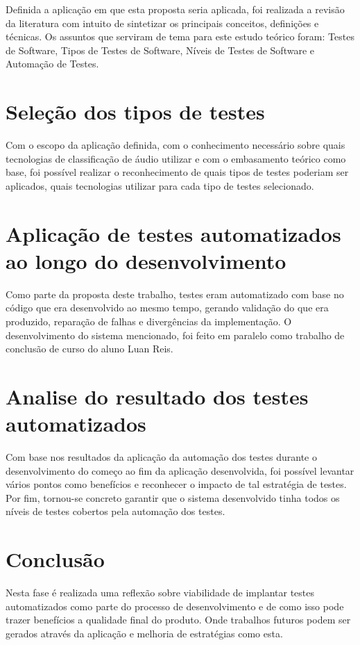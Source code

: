 Definida a aplicação em que esta proposta seria aplicada, foi realizada a revisão da literatura com intuito de sintetizar os principais conceitos, definições e técnicas. Os assuntos que serviram de tema para este estudo teórico foram: Testes de Software, Tipos de Testes de Software, Níveis de Testes de Software e Automação de Testes.

\section{Seleção dos tipos de testes}

Com o escopo da aplicação definida, com o conhecimento necessário sobre quais tecnologias de classificação de áudio utilizar e com o embasamento teórico como base, foi possível realizar o reconhecimento de quais tipos de testes poderiam ser aplicados, quais tecnologias utilizar para cada tipo de testes selecionado. 

\section{Aplicação de testes automatizados ao longo do desenvolvimento}

Como parte da proposta deste trabalho, testes eram automatizado com base no código que era desenvolvido ao mesmo tempo, gerando validação do que era produzido, reparação de falhas e divergências da implementação. O desenvolvimento do sistema mencionado, foi feito em paralelo como trabalho de conclusão de curso do aluno Luan Reis.

\section{Analise do resultado dos testes automatizados}

Com base nos resultados da aplicação da automação dos testes durante o desenvolvimento do começo ao fim da aplicação desenvolvida, foi possível levantar vários pontos como benefícios e reconhecer o impacto de tal estratégia de testes. Por fim, tornou-se concreto garantir que o sistema desenvolvido tinha todos os níveis de testes cobertos pela automação dos testes. 

\section{Conclusão}

Nesta fase é realizada uma reflexão sobre viabilidade de implantar testes automatizados como parte do processo de desenvolvimento e de como isso pode trazer benefícios a qualidade final do produto.  Onde trabalhos futuros podem ser gerados através da aplicação e melhoria de estratégias como esta. 